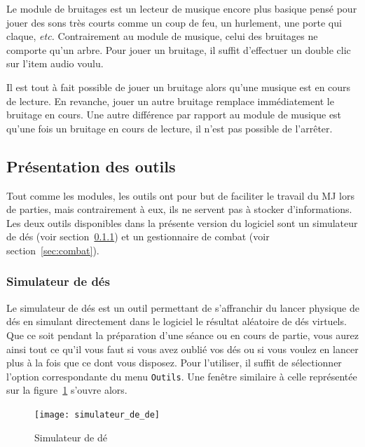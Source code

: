 \documentclass[a4paper,12pt]{article}
\newcommand*{\interfaceitem}[1]{\texttt{#1}}
\begin{document}
Le module de bruitages est un lecteur de musique encore plus basique pensé pour jouer des sons très courts comme un coup de feu, un hurlement, une porte qui claque, \emph{etc.}
Contrairement au module de musique, celui des bruitages ne comporte qu'un arbre.
Pour jouer un bruitage, il suffit d'effectuer un double clic sur l'item audio voulu.

Il est tout à fait possible de jouer un bruitage alors qu'une musique est en cours de lecture.
En revanche, jouer un autre bruitage remplace immédiatement le bruitage en cours.
Une autre différence par rapport au module de musique est qu'une fois un bruitage en cours de lecture, il n'est pas possible de l'arrêter.

\subsection{Présentation des outils}
\label{sec:outils}

Tout comme les modules, les outils ont pour but de faciliter le travail du MJ lors de parties, mais contrairement à eux, ils ne servent pas à stocker d'informations.
Les deux outils disponibles dans la présente version du logiciel sont un simulateur de dés (voir section~\ref{sec:des}) et un gestionnaire de combat (voir section~\ref{sec:combat}).

\subsubsection{Simulateur de dés}
\label{sec:des}

Le simulateur de dés est un outil permettant de s'affranchir du lancer physique de dés en simulant directement dans le logiciel le résultat aléatoire de dés virtuels.
Que ce soit pendant la préparation d'une séance ou en cours de partie, vous aurez ainsi tout ce qu'il vous faut si vous avez oublié vos dés ou si vous voulez en lancer plus à la fois que ce dont vous disposez.
Pour l'utiliser, il suffit de sélectionner l'option correspondante du menu \interfaceitem{Outils}.
Une fenêtre similaire à celle représentée sur la figure~\ref{simulateur_de} s'ouvre alors.
\begin{figure}[h]
    \texttt{[image: simulateur\_de\_de]}
    \caption{Simulateur de dé}
    \label{simulateur_de}
\end{figure}
\end{document}
